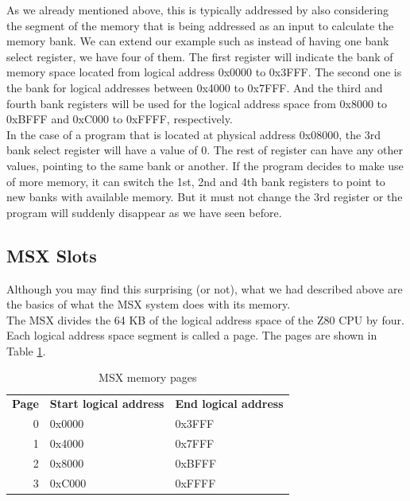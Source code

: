 As we already mentioned above, this is typically addressed by also considering the segment of the memory that is being addressed as an input to calculate the memory bank. We can extend our example such as instead of having one bank select register, we have four of them. The first register will indicate the bank of memory space located from logical address 0x0000 to 0x3FFF. The second one is the bank for logical addresses between 0x4000 to 0x7FFF. And the third and fourth bank registers will be used for the logical address space from 0x8000 to 0xBFFF and 0xC000 to 0xFFFF, respectively. \\

In the case of a program that is located at physical address 0x08000, the 3rd bank select register will have a value of 0. The rest of register can have any other values, pointing to the same bank or another. If the program decides to make use of more memory, it can switch the 1st, 2nd and 4th bank registers to point to new banks with available memory. But it must not change the 3rd register or the program will suddenly disappear as we have seen before. 

\subsection{MSX Slots}

Although you may find this surprising (or not), what we had described above are the basics of what the MSX system does with its memory.\\

The MSX divides the 64 KB of the logical address space of the Z80 CPU by four. Each logical address space segment is called a page. The pages are shown in Table \ref{table:msx-mem-pages}.

\begin{table}[h]
	\centering
	\begin{tabular}{r|l|l}
		{\bf Page} & {\bf Start logical address} & {\bf End logical address} \\
		0          & 0x0000                      & 0x3FFF                    \\
		1          & 0x4000                      & 0x7FFF                    \\
		2          & 0x8000                      & 0xBFFF                    \\
		3          & 0xC000                      & 0xFFFF                    \\
	\end{tabular}
	\caption{MSX memory pages}
	\label{table:msx-mem-pages}
\end{table}

